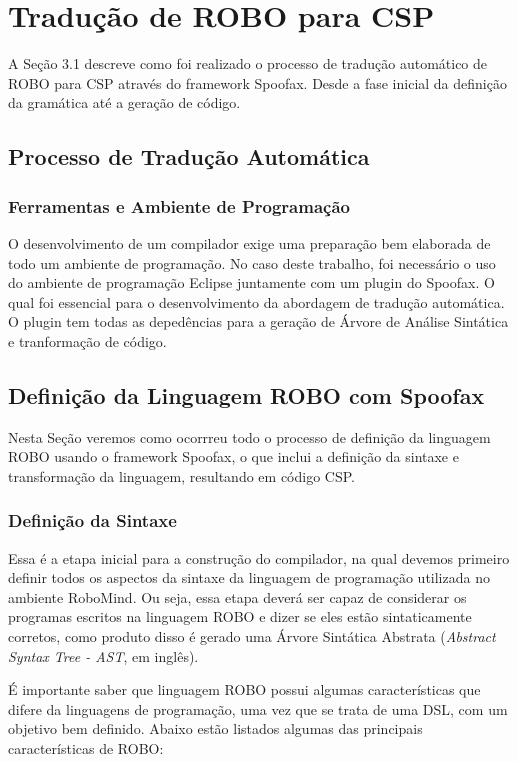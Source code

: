 \chapter{Tradução de ROBO para CSP}
A Seção 3.1 descreve como foi realizado o processo de tradução automático de ROBO para CSP através do framework Spoofax. Desde a fase inicial da definição da gramática até a geração de código.

\section{Processo de Tradução Automática}

\subsection{Ferramentas e Ambiente de Programação}
O desenvolvimento de um compilador exige uma preparação bem elaborada de todo um ambiente de programação. No caso deste trabalho, foi necessário o uso do ambiente de programação Eclipse juntamente com um plugin do Spoofax. O qual foi essencial para o desenvolvimento da abordagem de tradução automática. O plugin tem todas as depedências para a geração de Árvore de Análise Sintática e tranformação de código.

\section{Definição da Linguagem ROBO com Spoofax}
Nesta Seção veremos como ocorrreu todo o processo de definição da linguagem ROBO usando o framework Spoofax, o que inclui a definição da sintaxe e transformação da linguagem, resultando em código CSP.
\subsection{Definição da Sintaxe}
Essa é a etapa inicial para a construção do compilador, na qual devemos primeiro definir todos os aspectos da sintaxe da linguagem de programação utilizada no ambiente RoboMind. Ou seja, essa etapa deverá ser capaz de considerar os programas escritos na linguagem ROBO e dizer se eles estão sintaticamente corretos, como produto disso é gerado uma Árvore Sintática Abstrata (\textit{Abstract Syntax Tree - AST}, em inglês).

É importante saber que linguagem ROBO possui algumas características que difere da linguagens de programação, uma vez que se trata de uma DSL, com um objetivo bem definido. Abaixo estão listados algumas das principais características de ROBO:

